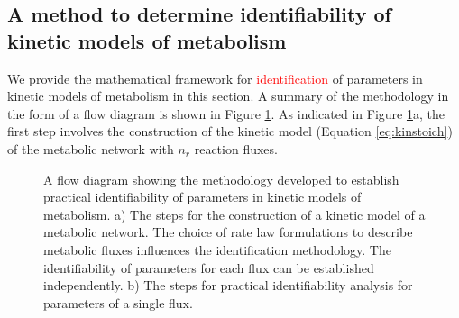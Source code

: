 \documentclass[10pt]{article}
\begin{document}
	\subsection{A method to determine identifiability of kinetic models of metabolism}\label{sec:ident}
	We provide the mathematical framework for \textcolor{red}{identification} of parameters in kinetic models of metabolism in this section. A summary of the methodology in the form of a flow diagram is shown in Figure \ref{fig:ident-flowchart}. As indicated in Figure \ref{fig:ident-flowchart}a, the first step involves the construction of the kinetic model (Equation \ref{eq:kinstoich}) of the metabolic network with $n_r$ reaction fluxes.
	
	\begin{figure}[!tbhp]
		\caption{A flow diagram showing the methodology developed to establish practical identifiability of parameters in kinetic models of metabolism. a) The steps for the construction of a kinetic model of a metabolic network. The choice of rate law formulations to describe metabolic fluxes influences the identification methodology. The identifiability of parameters for each flux can be established independently. b) The steps for practical identifiability analysis for parameters of a single flux.}\label{fig:ident-flowchart}
	\end{figure}	
	
\end{document}
